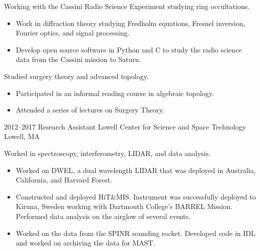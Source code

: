 \documentclass[a4paper,sans]{moderncv}
\begin{document}
            {%
                Working with the Cassini Radio Science
                Experiment studying ring occultations.
                \begin{itemize}
                    \item
                        Work in diffraction theory studying Fredholm
                        equations, Fresnel inversion, Fourier optics,
                        and signal processing.
                     \item
                        Develop open source software in Python and C to
                        study the radio science data from the Cassini mission to Saturn.
                 \end{itemize}
                 Studied surgery theory and advanced topology.
                 \begin{itemize}
                     \item
                        Participated in an informal reading
                        course in algebraic topology.
                     \item
                        Attended a series of lectures on Surgery Theory.
                 \end{itemize}%
             }
        \cventry%
            {2012--2017}
            {Research Assistant}
            {Lowell Center for Science and Space Technology}
            {Lowell, MA}
            {}
            {%
                Worked in spectroscopy, interferometry,
                LIDAR, and data analysis.
                \begin{itemize}
                    \item
                        Worked on DWEL, a dual wavelength LIDAR that was
                        deployed in Australia, California, and Harvard Forest.
                    \item
                        Constructed and deployed HiT\&MIS.
                        Instrument was successfully deployed to Kiruna,
                        Sweden working with Dartmouth College's BARREL
                        Mission. Performed data analysis on the airglow of
                        several events.
                    \item
                        Worked on the data from the SPINR sounding rocket.
                        Developed code in IDL and worked on archiving the
                        data for MAST.
                \end{itemize}%
             }
        \cventry%
\end{document}
